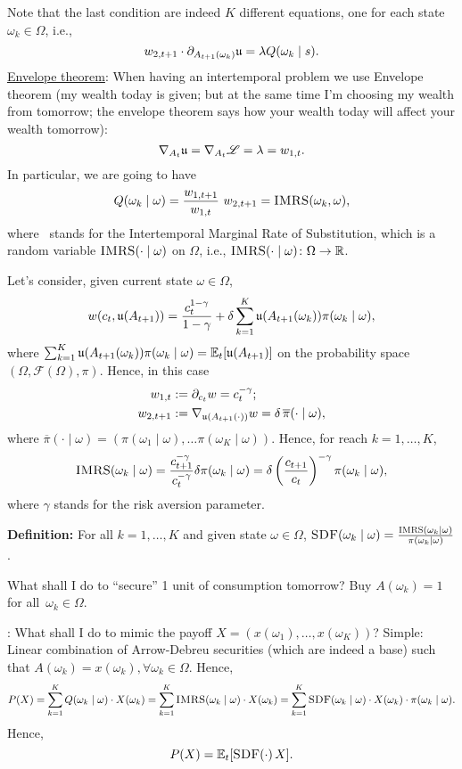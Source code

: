 Note that the last condition are indeed $K$ different equations, one for each state $\omega_k\in \Omega$, i.e., 
$$
	w_{2,t+1} \cdot \partial_{A_{t+1}(\omega_{k})}\mathfrak{u} = \lambda Q(\omega_k\mid s).
$$
\underline{Envelope theorem}: When having an intertemporal problem we use Envelope theorem (my wealth today is given; but at the same time I'm choosing my wealth from tomorrow; the envelope theorem says how your wealth today will affect your wealth tomorrow):
$$
	\nabla_{A_t} \mathfrak{u} = \nabla_{A_t}\mathscr{L} = \lambda = w_{1,t}.
$$
In particular, we are going to have
$$
	Q(\omega_k\mid \omega) = \frac{w_{1,t+1}}{w_{1,t}}\ w_{2,t+1} = \textsc{IMRS}(\omega_k,\omega),
$$
where \imrs \ stands for the  Intertemporal Marginal Rate of Substitution, which is a random variable $\textsc{IMRS}(\cdot\mid \omega)$ on $\Omega$, i.e., $\textsc{IMRS}(\cdot\mid\omega)\colon\Omega\to\mathbb{R}$.

\begin{example}
	Let's consider, given current state $\omega\in\Omega$,
	$$
		w(c_t, \mathfrak{u}(A_{t+1})) = \frac{c_{t}^{1-\gamma}}{1-\gamma} + \delta \sum_{k=1}^K \mathfrak{u}(A_{t+1}(\omega_k))\pi(\omega_{k}\mid \omega),
	$$
	where $ \sum_{k=1}^K \mathfrak{u}(A_{t+1}(\omega_k))\pi(\omega_{k}\mid \omega)= \mathbb{E}_t[\mathfrak{u}(A_{t+1})]$ on the probability space $(\Omega,\mathcal{F}(\Omega), \pi)$. Hence, in this case
	$$
		\begin{aligned}
			w_{1,t} &:= \partial_{c_{t}} w = c_t^{-\gamma};\\
			w_{2,{t+1}} &:= \nabla_{\mathfrak{u}(A_{t+1}(\cdot))}w = \delta\,\overline{\pi}(\cdot\mid \omega),
		\end{aligned}
	$$
	where $\overline{\pi}(\cdot\mid \omega) = (\pi(\omega_1\mid\omega),\ldots\pi(\omega_K\mid\omega))$. Hence, for reach $k=1,\ldots, K$,
	$$
		\textsc{IMRS}(\omega_k\mid \omega) = \frac{c_{t+1}^{-\gamma}}{c_t^{-\gamma}} \delta\pi(\omega_k\mid \omega) = \delta \left(\frac{c_{t+1}}{c_t}\right)^{-\gamma}\pi(\omega_k\mid \omega),
	$$
	where $\gamma$ stands for the risk aversion parameter.
\end{example}
\textbf{Definition:} For all $k=1,\ldots, K$ and given state $\omega\in\Omega$, $\textsc{SDF}(\omega_k\mid \omega) = \frac{\textsc{IMRS}(\omega_k\mid \omega)}{\pi(\omega_k\mid \omega)}$.

\question What shall I do to ``secure'' 1 unit of consumption tomorrow? Buy $A(\omega_k) = 1$ for all~$\omega_k\in \Omega$.

\question: What shall I do to mimic the payoff $X = (x(\omega_1),\ldots, x(\omega_K))$? Simple: Linear combination of Arrow-Debreu securities (which are indeed a base) such that $A(\omega_k) = x(\omega_k), \forall \omega_k\in \Omega$. Hence,
$$
	P(X) = \sum_{k=1}^K Q(\omega_k\mid \omega)\cdot X(\omega_k) = \sum_{k=1}^K\textsc{IMRS}(\omega_k\mid \omega) \cdot X(\omega_k) = \sum_{k=1}^K \textsc{SDF}(\omega_k\mid \omega)\cdot X(\omega_k)\cdot\pi(\omega_k\mid \omega).
$$
Hence,
$$
	P(X) = \mathbb{E}_t[\textsc{SDF}(\cdot)\,X].
$$


